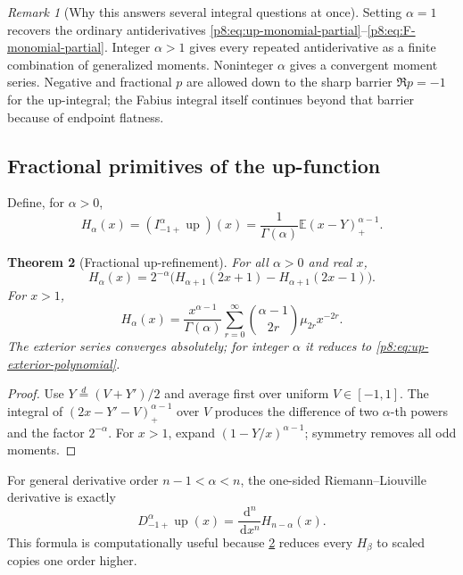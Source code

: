 \documentclass[11pt,oneside]{article}
\newtheorem{theorem}{Theorem}[section]
\theoremstyle{definition}
\theoremstyle{remark}
\newtheorem{remark}[theorem]{Remark}
\newcommand{\Up}{\operatorname{up}}
\newcommand{\E}{\mathbb E}
\newcommand{\dd}{\,\mathrm d}
\newcommand{\1}{\mathbf 1}
\begin{document}
\begin{remark}[Why this answers several integral questions at once]
Setting \(\alpha=1\) recovers the ordinary antiderivatives
\eqref{p8:eq:up-monomial-partial}--\eqref{p8:eq:F-monomial-partial}.  Integer
\(\alpha>1\) gives every repeated antiderivative as a finite combination of
generalized moments.  Noninteger \(\alpha\) gives a convergent moment series.
Negative and fractional \(p\) are allowed down to the sharp barrier
\(\Re p=-1\) for the up-integral; the Fabius integral itself continues beyond
that barrier because of endpoint flatness.
\end{remark}

\subsection{Fractional primitives of the up-function}

Define, for \(\alpha>0\),
\begin{equation}
 H_\alpha(x)=(I_{-1+}^{\alpha}\Up)(x)
 =\frac1{\Gamma(\alpha)}\E(x-Y)_+^{\alpha-1}.
 \label{p8:eq:Halpha}
\end{equation}

\begin{theorem}[Fractional up-refinement]
\label{p8:thm:up-fractional-refinement}
For all \(\alpha>0\) and real \(x\),
\begin{equation}
 \boxed{
 H_\alpha(x)=2^{-\alpha}
 \bigl(H_{\alpha+1}(2x+1)-H_{\alpha+1}(2x-1)\bigr).}
 \label{p8:eq:up-fractional-refinement}
\end{equation}
For \(x>1\),
\begin{equation}
 \boxed{
 H_\alpha(x)=\frac{x^{\alpha-1}}{\Gamma(\alpha)}
 \sum_{r=0}^{\infty}
 \binom{\alpha-1}{2r}\mu_{2r}x^{-2r}.}
 \label{p8:eq:Halpha-exterior}
\end{equation}
The exterior series converges absolutely; for integer \(\alpha\) it reduces to
\eqref{p8:eq:up-exterior-polynomial}.  \statusprovedPartll
\end{theorem}

\begin{proof}
Use \(Y\stackrel d=(V+Y')/2\) and average first over uniform
\(V\in[-1,1]\).  The integral of \((2x-Y'-V)_+^{\alpha-1}\) over \(V\)
produces the difference of two \(\alpha\)-th powers and the factor
\(2^{-\alpha}\).  For \(x>1\), expand
\((1-Y/x)^{\alpha-1}\); symmetry removes all odd moments.
\end{proof}

For general derivative order \(n-1<\alpha<n\), the one-sided
Riemann--Liouville derivative is exactly
\begin{equation}
 D_{-1+}^{\alpha}\Up(x)
 =\frac{\dd^n}{\dd x^n}H_{n-\alpha}(x).
 \label{p8:eq:up-RL-derivative-H}
\end{equation}
This formula is computationally useful because \cref{p8:thm:up-fractional-refinement}
reduces every \(H_\beta\) to scaled copies one order higher.
\end{document}
